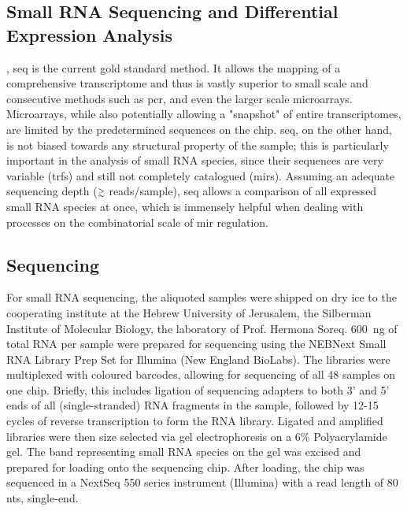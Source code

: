 \begin{method}
\section{Small RNA Sequencing and Differential Expression Analysis}
, \ac{seq} is the current gold standard method. It allows the mapping of a comprehensive transcriptome and thus is vastly superior to small scale and consecutive methods such as \ac{pcr}, and even the larger scale microarrays. Microarrays, while also potentially allowing a "snapshot" of entire transcriptomes, are limited by the predetermined sequences on the chip. \ac{seq}, on the other hand, is not biased towards any structural property of the sample; this is particularly important in the analysis of small RNA species, since their sequences are very variable (\acp{trf}) and still not completely catalogued (\acp{mir}). Assuming an adequate sequencing depth ($\smallgtrsim$ reads/sample), \ac{seq} allows a comparison of all expressed small RNA species at once, which is immensely helpful when dealing with processes on the combinatorial scale of \ac{mir} regulation.

\subsection{Sequencing}

For small RNA sequencing, the aliquoted samples were shipped on dry ice to the cooperating institute at the Hebrew University of Jerusalem, the Silberman Institute of Molecular Biology, the laboratory of Prof. Hermona Soreq. \SI{600}{\nano\gram} of total RNA per sample were prepared for sequencing using the NEBNext Small RNA Library Prep Set for Illumina (New England BioLabs). The libraries were multiplexed with coloured barcodes, allowing for sequencing of all 48 samples on one chip. Briefly, this includes ligation of sequencing adapters to both 3' and 5' ends of all (single-stranded) RNA fragments in the sample, followed by 12-15 cycles of reverse transcription to form the RNA library. Ligated and amplified libraries were then size selected via gel electrophoresis on a 6\% Polyacrylamide gel. The band representing small RNA species on the gel was excised and prepared for loading onto the sequencing chip. After loading, the chip was sequenced in a NextSeq 550 series instrument (Illumina) with a read length of 80 \acfp{nt}, single-end. 


\end{method}
